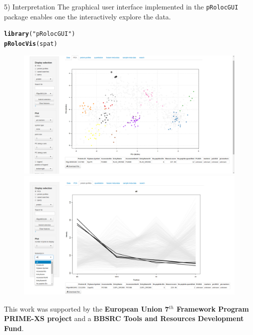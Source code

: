 \documentclass[final]{beamer}\usepackage[]{graphicx}\usepackage[]{color}
\makeatletter
\newcommand{\hlstr}[1]{\textcolor[rgb]{0.192,0.494,0.8}{#1}}%
\newcommand{\hlstd}[1]{\textcolor[rgb]{0.345,0.345,0.345}{#1}}%
\newcommand{\hlkwd}[1]{\textcolor[rgb]{0.737,0.353,0.396}{\textbf{#1}}}%
\newenvironment{kframe}{%
 \def\at@end@of@kframe{}%
 \ifinner\ifhmode%
  \def\at@end@of@kframe{\end{minipage}}%
  \begin{minipage}{\columnwidth}%
 \fi\fi%
 \def\FrameCommand##1{\hskip\@totalleftmargin \hskip-\fboxsep
 \colorbox{shadecolor}{##1}\hskip-\fboxsep
     \hskip-\linewidth \hskip-\@totalleftmargin \hskip\columnwidth}%
 \MakeFramed {\advance\hsize-\width
   \@totalleftmargin\z@ \linewidth\hsize
   \@setminipage}}%
 {\par\unskip\endMakeFramed%
 \at@end@of@kframe}
\newenvironment{knitrout}{}{} %
\newcommand{\Rpackage}[1]{{\mbox{\texttt{#1}}}}
\makeatother
\begin{document}
\begin{frame}[fragile]
\begin{columns}
\begin{column}{.48\textwidth}

      \begin{block}{5) Interpretation}
        The graphical user interface implemented in the
        \Rpackage{pRolocGUI} package enables one the interactively
        explore the data.
\begin{knitrout}
\color{fgcolor}\begin{kframe}
\begin{alltt}
\hlkwd{library}\hlstd{(}\hlstr{"pRolocGUI"}\hlstd{)}
\hlkwd{pRolocVis}\hlstd{(spat)}
\end{alltt}
\end{kframe}
\end{knitrout}
      \end{block}
      \begin{figure}
        \centering
        \includegraphics[width=.5\linewidth]{./figures/gui1.png}
        \includegraphics[width=.5\linewidth]{./figures/gui2.png}
      \end{figure}

      {\small This work was supported by the \textbf{European Union
          7$^{th}$ Framework Program PRIME-XS project} and a
        \textbf{BBSRC Tools and Resources Development Fund}.}

    \end{column}    
  \end{columns}
\end{frame}
\end{document}
